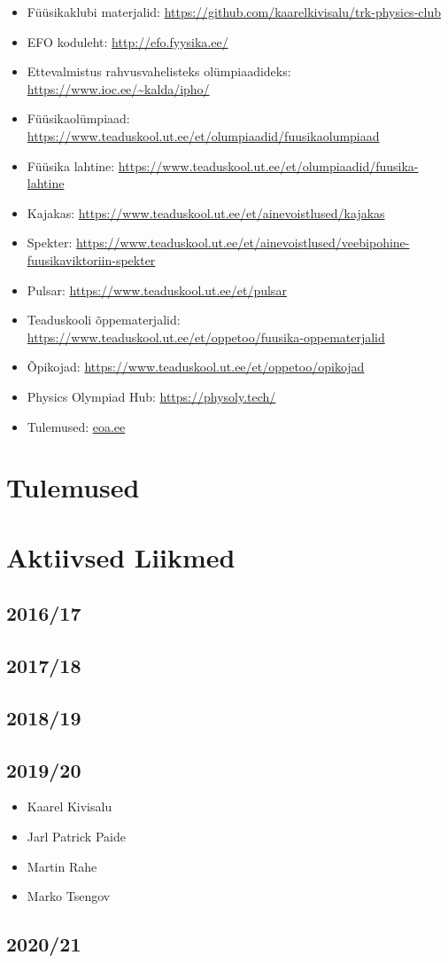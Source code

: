 \documentclass[a4paper,11pt,twocolumn]{article}
\begin{document}
\begin{itemize}
\item Füüsikaklubi materjalid: \url{https://github.com/kaarelkivisalu/trk-physics-club}
\item EFO koduleht: \url{http://efo.fyysika.ee/}
\item Ettevalmistus rahvusvahelisteks olümpiaadideks: \url{https://www.ioc.ee/~kalda/ipho/}
\item Füüsikaolümpiaad: \url{https://www.teaduskool.ut.ee/et/olumpiaadid/fuusikaolumpiaad}
\item Füüsika lahtine: \url{https://www.teaduskool.ut.ee/et/olumpiaadid/fuusika-lahtine}
\item Kajakas: \url{https://www.teaduskool.ut.ee/et/ainevoistlused/kajakas}
\item Spekter: \url{https://www.teaduskool.ut.ee/et/ainevoistlused/veebipohine-fuusikaviktoriin-spekter}
\item Pulsar: \url{https://www.teaduskool.ut.ee/et/pulsar}
\item Teaduskooli õppematerjalid: \url{https://www.teaduskool.ut.ee/et/oppetoo/fuusika-oppematerjalid}
\item Õpikojad: \url{https://www.teaduskool.ut.ee/et/oppetoo/opikojad}
\item Physics Olympiad Hub: \url{https://physoly.tech/}
\item Tulemused: \url{eoa.ee}
\end{itemize}


\section{Tulemused}

\section{Aktiivsed Liikmed}

\subsection{2016/17}
\subsection{2017/18}
\subsection{2018/19}
\subsection{2019/20}
\begin{itemize}
\item Kaarel Kivisalu
\item Jarl Patrick Paide
\item Martin Rahe
\item Marko Tsengov



\end{itemize}

\subsection{2020/21}
\end{document}
